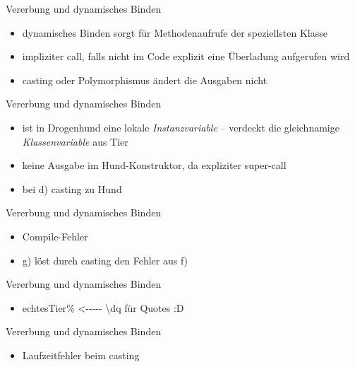\begin{frame}[fragile]{Vererbung und dynamisches Binden}
    \begin{solve}[a) b) c)]
        \begin{itemize}
            \item dynamisches Binden sorgt für Methodenaufrufe der speziellsten Klasse
            \item impliziter  call, falls nicht im Code explizit eine Überladung aufgerufen wird
            \item casting oder Polymorphismus ändert die Ausgaben nicht
        \end{itemize}
    \end{solve}
\end{frame}
\addtocounter{solve}{-1}
\begin{frame}[fragile]{Vererbung und dynamisches Binden}
    \begin{solve}[d) i)]
        \begin{itemize}
            \item {} ist in Drogenhund eine lokale \textit{Instanzvariable} -- verdeckt die gleichnamige \textit{Klassenvariable} aus Tier
            \item keine Ausgabe im Hund-Konstruktor, da expliziter super-call
            \item bei d) casting zu Hund
        \end{itemize}
    \end{solve}
\end{frame}
\addtocounter{solve}{-1}
\begin{frame}[fragile]{Vererbung und dynamisches Binden}
    \begin{solve}[e) f) g)]
        \begin{itemize}
            \item Compile-Fehler
            \item g) löst durch casting den Fehler aus f)
        \end{itemize}
    \end{solve}
\end{frame}
\addtocounter{solve}{-1}
\begin{frame}[fragile]{Vererbung und dynamisches Binden}
    \begin{solve}[h)]
        \begin{itemize}
            \item \dq echtes\dq Tier{\hfill\small\color{lightgray}\% <{-}{-}{-}{-}{-} \textbackslash dq für Quotes :D}
        \end{itemize}
    \end{solve}
\end{frame}
\addtocounter{solve}{-1}
\begin{frame}[fragile]{Vererbung und dynamisches Binden}
    \begin{solve}[j)]
        \begin{itemize}
            \item Laufzeitfehler beim casting
        \end{itemize}
    \end{solve}
\end{frame}